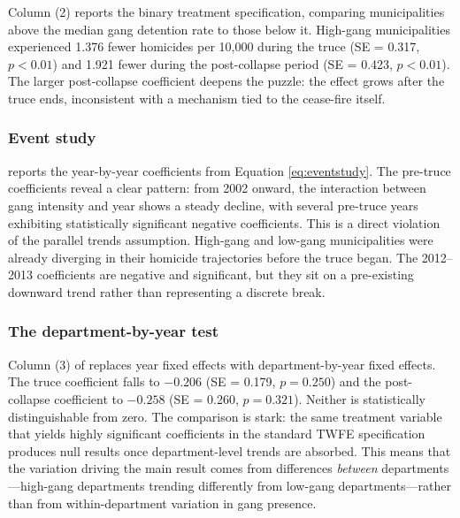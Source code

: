 \documentclass[12pt]{article}
\begin{document}
Column (2) reports the binary treatment specification, comparing municipalities above the median gang detention rate to those below it. High-gang municipalities experienced 1.376 fewer homicides per 10,000 during the truce (SE = 0.317, $p < 0.01$) and 1.921 fewer during the post-collapse period (SE = 0.423, $p < 0.01$). The larger post-collapse coefficient deepens the puzzle: the effect grows after the truce ends, inconsistent with a mechanism tied to the cease-fire itself.

\begin{table}[H]

\label{tab:main}
\end{table}

\subsubsection*{Event study}  reports the year-by-year coefficients from Equation \ref{eq:eventstudy}. The pre-truce coefficients reveal a clear pattern: from 2002 onward, the interaction between gang intensity and year shows a steady decline, with several pre-truce years exhibiting statistically significant negative coefficients. This is a direct violation of the parallel trends assumption. High-gang and low-gang municipalities were already diverging in their homicide trajectories before the truce began. The 2012--2013 coefficients are negative and significant, but they sit on a pre-existing downward trend rather than representing a discrete break.

\begin{table}[H]

\label{tab:eventstudy}
\end{table}

\subsubsection*{The department-by-year test} Column (3) of  replaces year fixed effects with department-by-year fixed effects. The truce coefficient falls to $-0.206$ (SE = 0.179, $p = 0.250$) and the post-collapse coefficient to $-0.258$ (SE = 0.260, $p = 0.321$). Neither is statistically distinguishable from zero. The comparison is stark: the same treatment variable that yields highly significant coefficients in the standard TWFE specification produces null results once department-level trends are absorbed. This means that the variation driving the main result comes from differences \textit{between} departments---high-gang departments trending differently from low-gang departments---rather than from within-department variation in gang presence.
\end{document}
